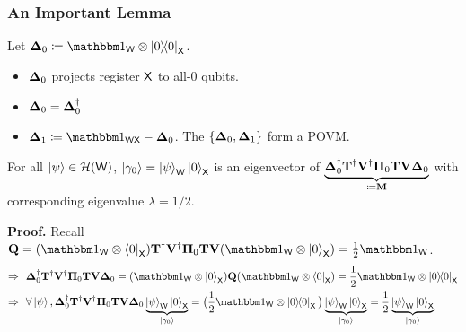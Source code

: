 \documentclass[aspectratio=1610, 12pt, xcolor={dvipsnames}]{beamer}
\begin{document}
\begin{frame}
\frametitle{An Important Lemma}
Let $\vb{\Delta}_0 \coloneqq \idm_\reg{w} \tensor \ketbra{0}_\reg{x}$.
\begin{itemize}
\item 
$\vb{\Delta}_0$ projects register $\reg{x}$ to all-$0$ qubits. 
\item
$\vb{\Delta}_0 = \vb{\Delta}^\dagger_0$ 
\item
$\vb{\Delta}_1 \coloneqq \idm_\reg{wx}  -  \vb{\Delta}_0$. The $\{\vb{\Delta}_0, \vb{\Delta}_1\}$ form a POVM.
\end{itemize}
{\small
\begin{LemmaBox}[label={lem:technical}]{}
 For all $\ket{\psi}\in \mathcal{H}(\reg{w})$, $\ket{\gamma_0} = \ket{\psi}_\reg{w}\ket{0}_\reg{x}$ is an eigenvector of $\underbrace{\vb{\Delta}^\dagger_0 \vb{T}^\dagger \vb{V}^\dagger \vb{\Pi}_0 \vb{T} \vb{V} \vb{\Delta}_0}_{\coloneqq \vb{M}}$ with corresponding eigenvalue $\lambda = 1/2$.
\end{LemmaBox}
}
{\bf Proof.} Recall $\vb{Q}	 = (\idm_\reg{w} \tensor \bra{0}_\reg{x}) \vb{T}^\dagger \vb{V}^\dagger \vb{\Pi}_0 \vb{T} \vb{V} (\idm_\reg{w} \tensor \ket{0}_\reg{x}) = \frac{1}{2}\idm_\reg{w}$.
\begin{align*}
\Rightarrow ~~ & 
\vb{\Delta}^\dagger_0 \vb{T}^\dagger \vb{V}^\dagger \vb{\Pi}_0 \vb{T} \vb{V} \vb{\Delta}_0 = (\idm_\reg{w}\tensor\ket{0}_\reg{x}) \vb{Q} (\idm_\reg{w}\tensor\bra{0}_\reg{x}) = \frac{1}{2} \idm_\reg{w} \tensor \ketbra{0}_\reg{x} \\
\Rightarrow ~~ &  \forall \ket{\psi}, \vb{\Delta}^\dagger_0 \vb{T}^\dagger \vb{V}^\dagger \vb{\Pi}_0 \vb{T} \vb{V} \vb{\Delta}_0 \underbrace{\ket{\psi}_\reg{w} \ket{0}_\reg{x}}_{\ket{\gamma_0}} = \big(\frac{1}{2} \idm_\reg{w} \tensor \ketbra{0}_\reg{x}\big) \underbrace{\ket{\psi}_\reg{w} \ket{0}_\reg{x}}_{\ket{\gamma_0}} = \frac{1}{2}\underbrace{\ket{\psi}_\reg{w} \ket{0}_\reg{x}}_{\ket{\gamma_0}}
\end{align*}
\end{frame}
\end{document}
